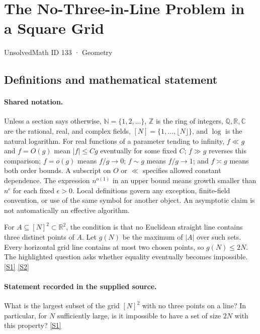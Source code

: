 \documentclass[11pt,a4paper]{article}
\newcommand{\N}{\mathbb{N}}
\newcommand{\Z}{\mathbb{Z}}
\newcommand{\Q}{\mathbb{Q}}
\newcommand{\R}{\mathbb{R}}
\newcommand{\C}{\mathbb{C}}
\newcommand{\sref}[2]{\hyperlink{source:#1:#2}{[S#2]}}
\begin{document}

\setcounter{section}{132}

\section{The No-Three-in-Line Problem in a Square Grid}\label{133}

{\small\sffamily UnsolvedMath ID 133 · Geometry}

\subsection{Definitions and mathematical statement}

\paragraph{Shared notation.}Unless a section says otherwise, $\N=\{1,2,\ldots\}$,
$\Z$ is the ring of integers, $\Q,\R,\C$ are the rational, real, and complex
fields, $[N]=\{1,\ldots,\lfloor N\rfloor\}$, and $\log$ is the natural
logarithm. For real functions of a parameter tending to infinity,
$f\ll g$ and $f=O(g)$ mean $|f|\leq Cg$ eventually for some fixed $C$;
$f\gg g$ reverses this comparison; $f=o(g)$ means $f/g\to0$;
$f\sim g$ means $f/g\to1$; and $f\asymp g$ means both order bounds.
A subscript on $O$ or $\ll$ specifies allowed constant dependence.
The expression $n^{o(1)}$ in an upper bound means growth smaller than
$n^\epsilon$ for each fixed $\epsilon>0$. Local definitions govern any
exception, finite-field convention, or use of the same symbol for another
object. An asymptotic claim is not automatically an effective algorithm.



For $A\subseteq[N]^2\subset\R^2$, the condition is that no Euclidean straight line contains three distinct points of $A$. Let $g(N)$ be the maximum of $|A|$ over such sets. Every horizontal grid line contains at most two chosen points, so $g(N)\leq2N$. The highlighted question asks whether equality eventually becomes impossible. \sref{133}{1} \sref{133}{2}

\paragraph{Statement recorded in the supplied source.}
What is the largest subset of the grid $[N]^2$ with no three points on a line? In particular, for $N$ sufficiently large, is it impossible to have a set of size $2N$ with this property? \sref{133}{1}
\end{document}
